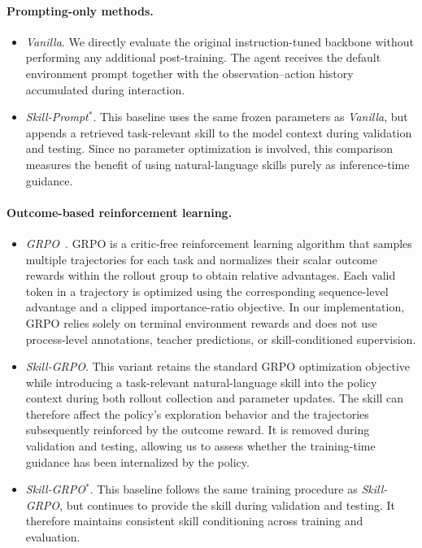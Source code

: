 \paragraph{Prompting-only methods.}
\begin{itemize}
    \item \textit{Vanilla}.
    We directly evaluate the original instruction-tuned backbone without performing any additional post-training.
    The agent receives the default environment prompt together with the observation--action history accumulated during interaction.

    \item \textit{Skill-Prompt}$^{*}$.
    This baseline uses the same frozen parameters as \textit{Vanilla}, but appends a retrieved task-relevant skill to the model context during validation and testing.
    Since no parameter optimization is involved, this comparison measures the benefit of using natural-language skills purely as inference-time guidance.
\end{itemize}

\paragraph{Outcome-based reinforcement learning.}
\begin{itemize}
    \item \textit{GRPO}~\citep{shao2024deepseekmath}.
    GRPO is a critic-free reinforcement learning algorithm that samples multiple trajectories for each task and normalizes their scalar outcome rewards within the rollout group to obtain relative advantages.
    Each valid token in a trajectory is optimized using the corresponding sequence-level advantage and a clipped importance-ratio objective.
    In our implementation, GRPO relies solely on terminal environment rewards and does not use process-level annotations, teacher predictions, or skill-conditioned supervision.

    \item \textit{Skill-GRPO}.
    This variant retains the standard GRPO optimization objective while introducing a task-relevant natural-language skill into the policy context during both rollout collection and parameter updates.
    The skill can therefore affect the policy's exploration behavior and the trajectories subsequently reinforced by the outcome reward.
    It is removed during validation and testing, allowing us to assess whether the training-time guidance has been internalized by the policy.

    \item \textit{Skill-GRPO}$^{*}$.
    This baseline follows the same training procedure as \textit{Skill-GRPO}, but continues to provide the skill during validation and testing.
    It therefore maintains consistent skill conditioning across training and evaluation.
\end{itemize}

